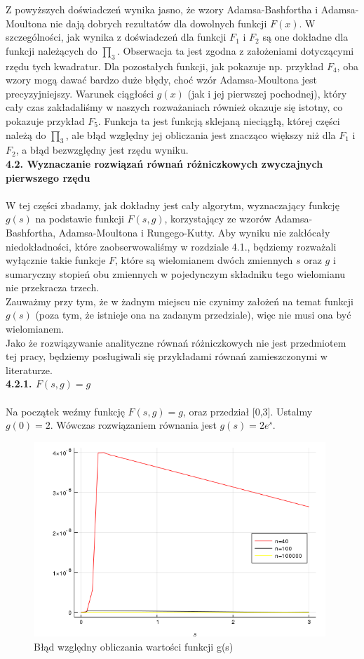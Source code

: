 \documentclass[a4paper]{article}
\begin{document}
Z powyższych doświadczeń wynika jasno, że wzory Adamsa-Bashfortha i Adamsa-Moultona nie dają dobrych rezultatów dla dowolnych funkcji $F(x)$. W szczególności, jak wynika z doświadczeń dla funkcji $F_1$ i $F_2$ są one dokładne dla funkcji należących do $\prod_3$. Obserwacja ta jest zgodna z założeniami dotyczącymi rzędu tych kwadratur. Dla pozostałych funkcji, jak pokazuje np. przykład $F_4$, oba wzory mogą dawać bardzo duże błędy, choć wzór Adamsa-Moultona jest precyzyjniejszy. Warunek ciągłości $g(x)$ (jak i jej pierwszej pochodnej), który cały czas zakładaliśmy w naszych rozważaniach również okazuje się istotny, co pokazuje przykład $F_5$. Funkcja ta jest funkcją sklejaną nieciągłą, której części należą do $\prod_3$, ale błąd względny jej obliczania jest znacząco większy niż dla $F_1$ i $F_2$, a błąd bezwzględny jest rzędu wyniku.\\

\large
\textbf{4.2. Wyznaczanie rozwiązań równań różniczkowych zwyczajnych pierwszego rzędu}\\\\
\normalsize
W tej części zbadamy, jak dokładny jest cały algorytm, wyznaczający funkcję $g(s)$ na podstawie funkcji $F(s,g)$, korzystający ze wzorów Adamsa-Bashfortha, Adamsa-Moultona i Rungego-Kutty. Aby wyniku nie zakłócały niedokładności, które zaobserwowaliśmy w rozdziale 4.1., będziemy rozważali wyłącznie takie funkcje $F$, które są wielomianem dwóch zmiennych $s$ oraz $g$ i sumaryczny stopień obu zmiennych w pojedynczym składniku tego wielomianu nie przekracza trzech.\\
Zauważmy przy tym, że w żadnym miejscu nie czynimy założeń na temat funkcji $g(s)$ (poza tym, że istnieje ona na zadanym przedziale), więc nie musi ona być wielomianem.\\
Jako że rozwiązywanie analityczne równań różniczkowych nie jest przedmiotem tej pracy, będziemy posługiwali się przykładami równań zamieszczonymi w literaturze. \cite{UW}\\

\large
\textbf{4.2.1. $F(s,g) = g$}\\\\
\normalsize
Na początek weźmy funkcję $F(s,g) = g$,  oraz przedział [0,3]. Ustalmy $g(0) = 2$. Wówczas rozwiązaniem równania jest $g(s) = 2e^s$.

\begin{figure}[h!]
  \includegraphics[width=11cm]{F1_error.png}
  \caption{Błąd względny obliczania wartości funkcji g(s)}
\end{figure}
\end{document}
